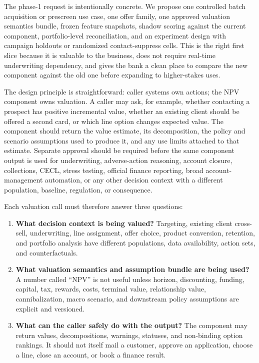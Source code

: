 \documentclass[11pt]{article}
\newcommand{\1}{\mathbf{1}}
\begin{document}
The phase-1 request is intentionally concrete. We propose one controlled batch
acquisition or prescreen use case, one offer family, one approved valuation
semantics bundle, frozen feature snapshots, shadow scoring against the current
component, portfolio-level reconciliation, and an experiment design with
campaign holdouts or randomized contact-suppress cells. This is the right first
slice because it is valuable to the business, does not require real-time
underwriting dependency, and gives the bank a clean place to compare the new
component against the old one before expanding to higher-stakes uses.

The design principle is straightforward: caller systems own actions; the NPV
component owns valuation. A caller may ask, for example, whether contacting a
prospect has positive incremental value, whether an existing client should be
offered a second card, or which line option changes expected value. The
component should return the value estimate, its decomposition, the policy and
scenario assumptions used to produce it, and any use limits attached to that
estimate. Separate approval should be required before the same component output
is used for underwriting, adverse-action reasoning, account closure,
collections, CECL, stress testing, official finance reporting, broad
account-management automation, or any other decision context with a different
population, baseline, regulation, or consequence.

Each valuation call must therefore answer three questions:
\begin{enumerate}[label=\arabic*.]
  \item \textbf{What decision context is being valued?} Targeting, existing
        client cross-sell, underwriting, line assignment, offer choice, product
        conversion, retention, and portfolio analysis have different
        populations, data availability, action sets, and counterfactuals.
  \item \textbf{What valuation semantics and assumption bundle are being used?}
        A number called ``NPV'' is not useful unless horizon, discounting,
        funding, capital, tax, rewards, costs, terminal value, relationship
        value, cannibalization, macro scenario, and downstream policy
        assumptions are explicit and versioned.
  \item \textbf{What can the caller safely do with the output?} The component
        may return values, decompositions, warnings, statuses, and
        non-binding option rankings. It should not itself mail a customer,
        approve an application, choose a line, close an account, or book a
        finance result.
\end{enumerate}
\end{document}
